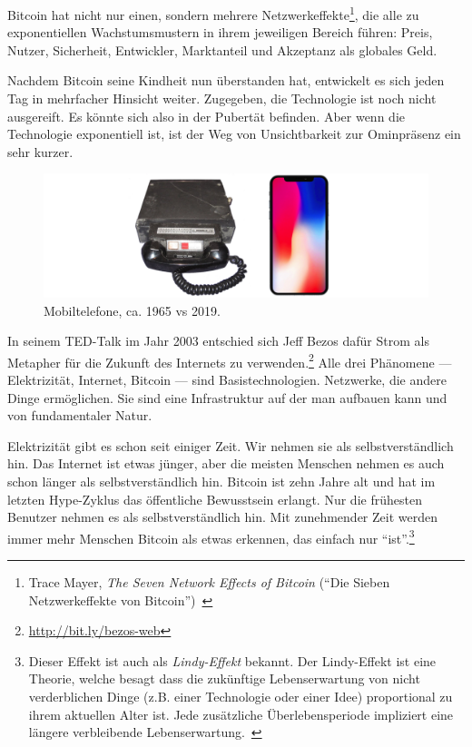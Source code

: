 Bitcoin hat nicht nur einen, sondern mehrere Netzwerkeffekte\footnote{Trace
Mayer, \textit{The Seven Network Effects of Bitcoin} (\enquote{Die Sieben
Netzwerkeffekte von Bitcoin})~\cite{7-network-effects}}, die alle zu
exponentiellen Wachstumsmustern in ihrem jeweiligen Bereich führen: Preis,
Nutzer, Sicherheit, Entwickler, Marktanteil und Akzeptanz als globales Geld.

Nachdem Bitcoin seine Kindheit nun überstanden hat, entwickelt es sich jeden Tag
in mehrfacher Hinsicht weiter. Zugegeben, die Technologie ist noch nicht
ausgereift. Es könnte sich also in der Pubertät befinden. Aber wenn die
Technologie exponentiell ist, ist der Weg von Unsichtbarkeit zur Ominpräsenz ein
sehr kurzer.

\begin{figure}
  \includegraphics{assets/images/mobile-phone.png}
  \caption{Mobiltelefone, ca. 1965 vs 2019.}
  \label{fig:mobile-phone}
\end{figure}

In seinem TED-Talk im Jahr 2003 entschied sich Jeff Bezos dafür Strom als
Metapher für die Zukunft des Internets zu
verwenden.\footnote{\url{http://bit.ly/bezos-web}} Alle drei Phänomene ---
Elektrizität, Internet, Bitcoin --- sind Basistechnologien. Netzwerke, die
andere Dinge ermöglichen. Sie sind eine Infrastruktur auf der man aufbauen kann
und von fundamentaler Natur.

Elektrizität gibt es schon seit einiger Zeit. Wir nehmen sie als
selbstverständlich hin. Das Internet ist etwas jünger, aber die meisten Menschen
nehmen es auch schon länger als selbstverständlich hin. Bitcoin ist zehn Jahre
alt und hat im letzten Hype-Zyklus das öffentliche Bewusstsein erlangt. Nur die
frühesten Benutzer nehmen es als selbstverständlich hin. Mit zunehmender Zeit
werden immer mehr Menschen Bitcoin als etwas erkennen, das einfach nur
\enquote{ist}.\footnote{Dieser Effekt ist auch als \textit{Lindy-Effekt}
bekannt. Der Lindy-Effekt ist eine Theorie, welche besagt dass die zukünftige
Lebenserwartung von nicht verderblichen Dinge (z.B. einer Technologie oder einer
Idee) proportional zu ihrem aktuellen Alter ist. Jede zusätzliche
Überlebensperiode impliziert eine längere verbleibende
Lebenserwartung.~\cite{wiki:lindy}}

